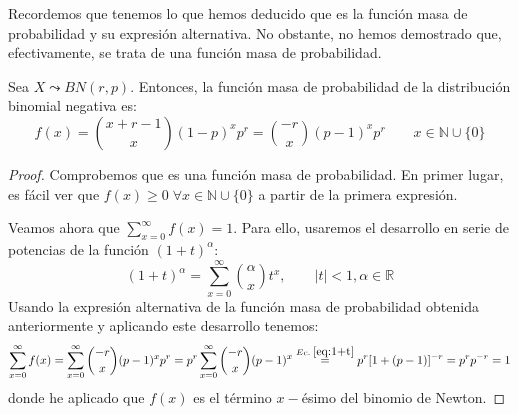Recordemos que tenemos lo que hemos deducido que es la función masa de probabilidad y su expresión alternativa. No obstante, no hemos demostrado que, efectivamente, se trata de una función masa de probabilidad.
\begin{prop}
    Sea $X\leadsto BN(r,p)$. Entonces, la función masa de probabilidad de la distribución binomial negativa es:
    \begin{equation*}
        f(x)
        = \binom{x+r-1}{x}(1-p)^{x}p^r
        = \binom{-r}{x}(p-1)^xp^r
        \qquad x\in \mathbb{N}\cup \{0\}
    \end{equation*}
\end{prop}
\begin{proof}
    Comprobemos que es una función masa de probabilidad. En primer lugar, es fácil ver que $f(x)\geq 0\;\forall x\in \mathbb{N}\cup \{0\}$ a partir de la primera expresión.
    
    Veamos ahora que $\sum\limits_{x=0}^\infty f(x)=1$. Para ello, usaremos el desarrollo en serie de potencias de la función $(1 + t)^\alpha$:
    \begin{equation}\label{eq:1+t}
        (1+t)^\alpha = \sum_{x=0}^\infty \binom{\alpha}{x}t^x,\qquad |t|<1, \alpha\in \mathbb{R}
    \end{equation}
    Usando la expresión alternativa de la función masa de probabilidad obtenida anteriormente y aplicando este desarrollo tenemos:
    \begin{equation*}
        \sum_{x=0}^\infty f(x)
        = \sum_{x=0}^\infty \binom{-r}{x}(p-1)^xp^r
        = p^r \sum_{x=0}^\infty \binom{-r}{x}(p-1)^x
        \stackrel{Ec.\;\ref{eq:1+t}}{=} p^r [1+(p-1)]^{-r} = p^rp^{-r}=1
    \end{equation*}
    donde he aplicado que $f(x)$ es el término $x-$ésimo del binomio de Newton.
\end{proof}

